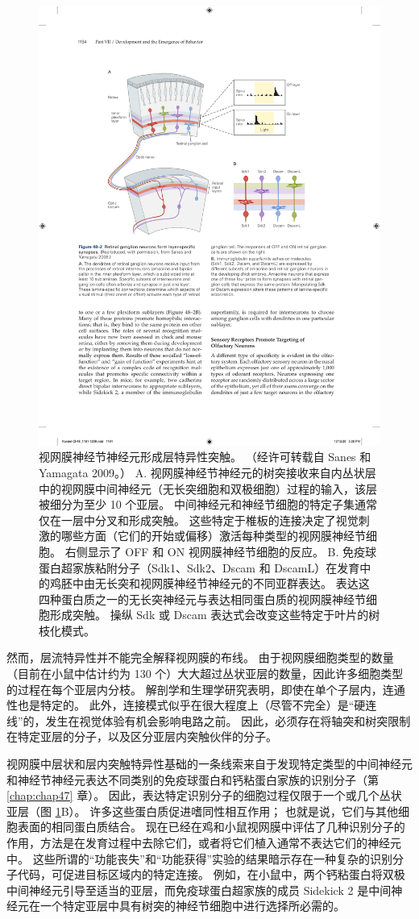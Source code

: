 \begin{figure}[htbp]
	\centering
	\includegraphics[width=0.75\linewidth]{chap48/fig_48_2}
	\caption{视网膜神经节神经元形成层特异性突触。 （经许可转载自 Sanes 和 Yamagata 2009。） A. 视网膜神经节神经元的树突接收来自内丛状层中的视网膜中间神经元（无长突细胞和双极细胞）过程的输入，该层被细分为至少 10 个亚层。 中间神经元和神经节细胞的特定子集通常仅在一层中分叉和形成突触。 这些特定于椎板的连接决定了视觉刺激的哪些方面（它们的开始或偏移）激活每种类型的视网膜神经节细胞。 右侧显示了 OFF 和 ON 视网膜神经节细胞的反应。 B. 免疫球蛋白超家族粘附分子（Sdk1、Sdk2、Dscam 和 DscamL）在发育中的鸡胚中由无长突和视网膜神经节神经元的不同亚群表达。 表达这四种蛋白质之一的无长突神经元与表达相同蛋白质的视网膜神经节细胞形成突触。 操纵 Sdk 或 Dscam 表达式会改变这些特定于叶片的树枝化模式。}
	\label{fig:48_2}
\end{figure}

然而，层流特异性并不能完全解释视网膜的布线。
由于视网膜细胞类型的数量（目前在小鼠中估计约为 130 个）大大超过丛状亚层的数量，因此许多细胞类型的过程在每个亚层内分枝。
解剖学和生理学研究表明，即使在单个子层内，连通性也是特定的。
此外，连接模式似乎在很大程度上（尽管不完全）是“硬连线”的，发生在视觉体验有机会影响电路之前。
因此，必须存在将轴突和树突限制在特定亚层的分子，以及区分亚层内突触伙伴的分子。


视网膜中层状和层内突触特异性基础的一条线索来自于发现特定类型的中间神经元和神经节神经元表达不同类别的免疫球蛋白和钙粘蛋白家族的识别分子（第 \ref{chap:chap47} 章）。
因此，表达特定识别分子的细胞过程仅限于一个或几个丛状亚层（图 \ref{fig:48_2}B）。
许多这些蛋白质促进嗜同性相互作用；
也就是说，它们与其他细胞表面的相同蛋白质结合。
现在已经在鸡和小鼠视网膜中评估了几种识别分子的作用，方法是在发育过程中去除它们，或者将它们植入通常不表达它们的神经元中。
这些所谓的“功能丧失”和“功能获得”实验的结果暗示存在一种复杂的识别分子代码，可促进目标区域内的特定连接。
例如，在小鼠中，两个钙粘蛋白将双极中间神经元引导至适当的亚层，而免疫球蛋白超家族的成员 Sidekick 2 是中间神经元在一个特定亚层中具有树突的神经节细胞中进行选择所必需的。



